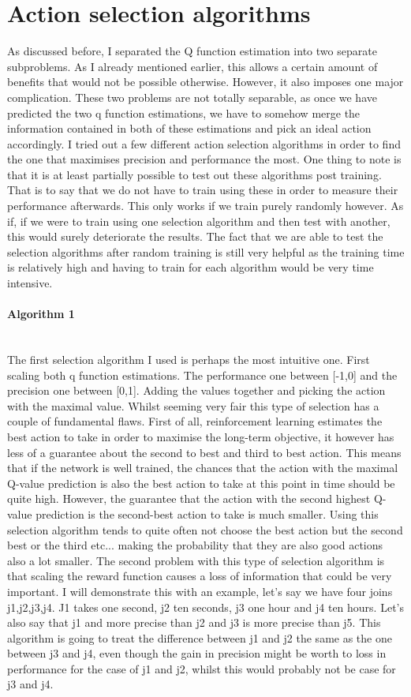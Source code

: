 \section{Action selection algorithms}
As discussed before, I separated the Q function estimation into two separate subproblems. As I already mentioned earlier, this allows a certain amount of benefits that would not be possible otherwise. However, it also imposes one major complication. These two problems are not totally separable, as once we have predicted the two q function estimations, we have to somehow merge the information contained in both of these estimations and pick an ideal action accordingly. I tried out a few different action selection algorithms in order to find the one that maximises precision and performance the most. One thing to note is that it is at least partially possible to test out these algorithms post training. That is to say that we do not have to train using these in order to measure their performance afterwards. This only works if we train purely randomly however. As if, if we were to train using one selection algorithm and then test with another, this would surely deteriorate the results. The fact that we are able to test the selection algorithms after random training is still very helpful as the training time is relatively high and having to train for each algorithm would be very time intensive.
\paragraph{Algorithm 1}\mbox{}\\
The first selection algorithm I used is perhaps the most intuitive one. First scaling both q function estimations. The performance one between [-1,0] and the precision one between [0,1]. Adding the values together and picking the action with the maximal value. Whilst seeming very fair this type of selection has a couple of fundamental flaws. First of all, reinforcement learning estimates the best action to take in order to maximise the long-term objective, it however has less of a guarantee about the second to best and third to best action. This means that if the network is well trained, the chances that the action with the maximal Q-value prediction is also the best action to take at this point in time should be quite high. However, the guarantee that the action with the second highest Q-value prediction is the second-best action to take is much smaller. Using this selection algorithm tends to quite often not choose the best action but the second best or the third etc... making the probability that they are also good actions also a lot smaller. The second problem with this type of selection algorithm is that scaling the reward function causes a loss of information that could be very important. I will demonstrate this with an example, let's say we have four joins j1,j2,j3,j4. J1 takes one second, j2 ten seconds, j3 one hour and j4 ten hours. Let's also say that j1 and more precise than j2 and j3 is more precise than j5. This algorithm is going to treat the difference between j1 and j2 the same as the one between j3 and j4, even though the gain in precision might be worth to loss in performance for the case of j1 and j2, whilst this would probably not be case for j3 and j4.
